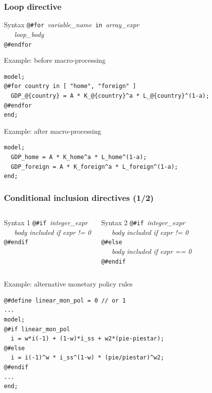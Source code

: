 \documentclass{beamer}
\begin{document}
\begin{frame}[fragile=singleslide]
  \frametitle{Loop directive}
  \begin{block}{Syntax}
\verb+@#for +\textit{variable\_name}\verb+ in +\textit{array\_expr} \\
\verb+   +\textit{loop\_body} \\
\verb+@#endfor+
  \end{block}
  \begin{block}{Example: before macro-processing}
    \small
\begin{verbatim}
model;
@#for country in [ "home", "foreign" ]
  GDP_@{country} = A * K_@{country}^a * L_@{country}^(1-a);
@#endfor
end;
\end{verbatim}
    \normalsize
  \end{block}

  \begin{block}{Example: after macro-processing}
    \small
\begin{verbatim}
model;
  GDP_home = A * K_home^a * L_home^(1-a);
  GDP_foreign = A * K_foreign^a * L_foreign^(1-a);
end;
\end{verbatim}
    \normalsize
  \end{block}
\end{frame}

\begin{frame}[fragile=singleslide]
  \frametitle{Conditional inclusion directives (1/2)}

  \begin{columns}[T]
    \begin{block}{Syntax 1}
\verb+@#if +\textit{integer\_expr} \\
\verb+   +\textit{body included if expr != 0} \\
\verb+@#endif+
    \end{block}

    \begin{block}{Syntax 2}
\verb+@#if +\textit{integer\_expr} \\
\verb+   +\textit{body included if expr != 0} \\
\verb+@#else+ \\
\verb+   +\textit{body included if expr == 0} \\
\verb+@#endif+
    \end{block}
  \end{columns}

  \begin{block}{Example: alternative monetary policy rules}
    \scriptsize
\begin{verbatim}
@#define linear_mon_pol = 0 // or 1
...
model;
@#if linear_mon_pol
  i = w*i(-1) + (1-w)*i_ss + w2*(pie-piestar);
@#else
  i = i(-1)^w * i_ss^(1-w) * (pie/piestar)^w2;
@#endif
...
end;
\end{verbatim}
    \scriptsize
  \end{block}
\end{frame}
\end{document}
